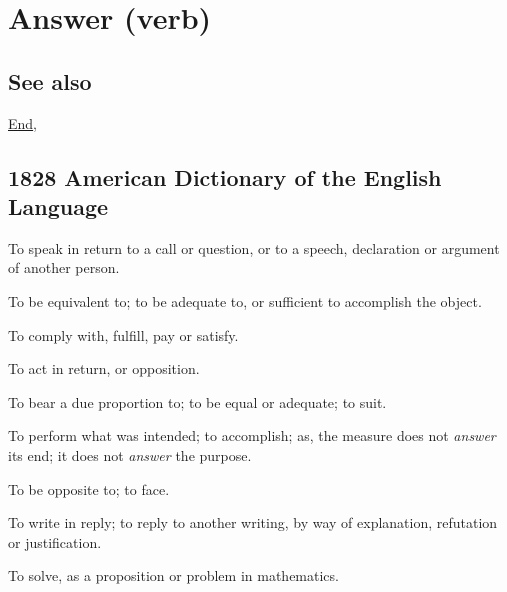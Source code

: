 \section{Answer (verb)}
	\label{ANSWER}
	
\subsection{See also}

	\hyperref[END]{End},

\subsection{1828 American Dictionary of the English Language} %
	\label{ANSWER-1828}

	\begin{compactitem}
		\item[1] To speak in return to a call or question, or to a speech, declaration or argument of another person.
		\item[2] To be equivalent to; to be adequate to, or sufficient to accomplish the object.
		\item[3] To comply with, fulfill, pay or satisfy.
		\item[4] To act in return, or opposition.
		\item[5] To bear a due proportion to; to be equal or adequate; to suit.
		\item[6] To perform what was intended; to accomplish; as, the measure does not \textit{answer} its end; it does not \textit{answer} the purpose.
		\item[7] To be opposite to; to face.
		\item[8] To write in reply; to reply to another writing, by way of explanation, refutation or justification.
		\item[9] To solve, as a proposition or problem in mathematics.
	\end{compactitem}


